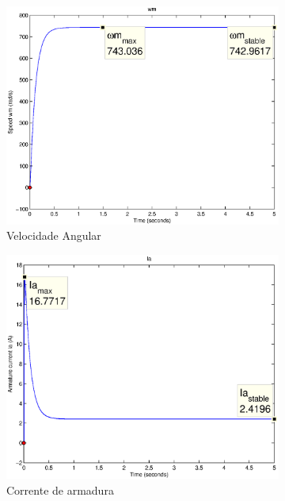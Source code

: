 \documentclass{article}
\begin{document}
\begin{figure}[H]
	\centering
	\begin{subfigure}[b]{0.49\linewidth}
		\includegraphics[width=\linewidth]{matlab/wm7}
		\caption{Velocidade Angular}
	\end{subfigure}
	\begin{subfigure}[b]{0.49\linewidth}
		\centering
		\includegraphics[width=\linewidth]{matlab/ia7}
		\caption{Corrente de armadura}
	\end{subfigure}
	\begin{subfigure}[b]{0.49\linewidth}
		\centering

\end{subfigure}
\end{figure}
\end{document}

